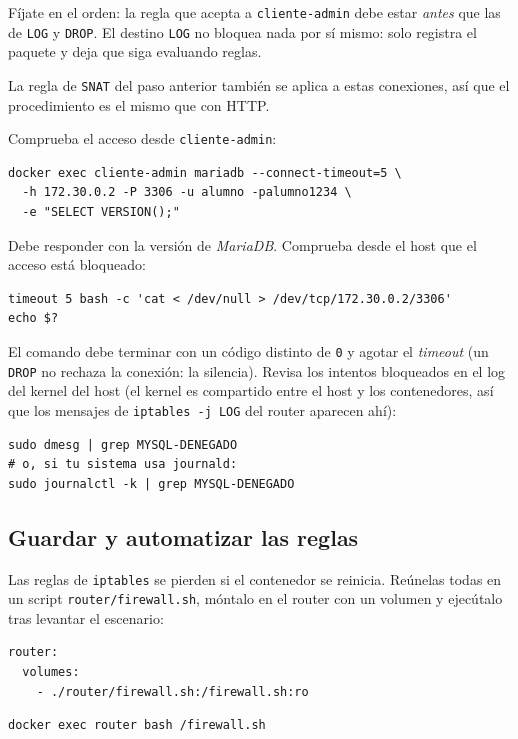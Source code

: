 \documentclass[a4paper]{article}
\begin{document}
Fíjate en el orden: la regla que acepta a \texttt{cliente-admin} debe estar \emph{antes} que las de \texttt{LOG} y \texttt{DROP}. El destino \texttt{LOG} no bloquea nada por sí mismo: solo registra el paquete y deja que siga evaluando reglas.

La regla de \texttt{SNAT} del paso anterior también se aplica a estas conexiones, así que el procedimiento es el mismo que con HTTP.

Comprueba el acceso desde \texttt{cliente-admin}:

\begin{verbatim}
docker exec cliente-admin mariadb --connect-timeout=5 \
  -h 172.30.0.2 -P 3306 -u alumno -palumno1234 \
  -e "SELECT VERSION();"
\end{verbatim}

Debe responder con la versión de \emph{MariaDB}. Comprueba desde el host que el acceso está bloqueado:

\begin{verbatim}
timeout 5 bash -c 'cat < /dev/null > /dev/tcp/172.30.0.2/3306'
echo $?
\end{verbatim}

El comando debe terminar con un código distinto de \texttt{0} y agotar el \emph{timeout} (un \texttt{DROP} no rechaza la conexión: la silencia). Revisa los intentos bloqueados en el log del kernel del host (el kernel es compartido entre el host y los contenedores, así que los mensajes de \texttt{iptables -j LOG} del router aparecen ahí):

\begin{verbatim}
sudo dmesg | grep MYSQL-DENEGADO
# o, si tu sistema usa journald:
sudo journalctl -k | grep MYSQL-DENEGADO
\end{verbatim}
\subsection{Guardar y automatizar las reglas}
\label{sec:org1546bc9}

Las reglas de \texttt{iptables} se pierden si el contenedor se reinicia. Reúnelas todas en un script \texttt{router/firewall.sh}, móntalo en el router con un volumen y ejecútalo tras levantar el escenario:

\begin{verbatim}
router:
  volumes:
    - ./router/firewall.sh:/firewall.sh:ro
\end{verbatim}

\begin{verbatim}
docker exec router bash /firewall.sh
\end{verbatim}
\end{document}
